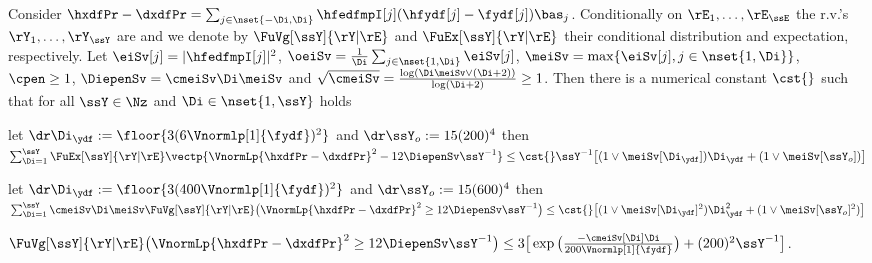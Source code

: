 \begin{lm}\label{au:re:rest}
Consider  
$\hxdfPr-\dxdfPr=\sum_{j\in\nset{-\Di,\Di}}\hfedfmpI[j](\hfydf[j]-\fydf[j])\bas_j$.
Conditionally on $\rE_1,\dotsc,\rE_{\ssE}$ the r.v.'s
$\rY_1,\dotsc,\rY_{\ssY}$ are \iid and we  denote by $\FuVg[\ssY]{\rY|\rE}$ and $\FuEx[\ssY]{\rY|\rE}$ their conditional
 distribution and expectation, respectively. 
Let $\eiSv[j]=|\hfedfmpI[j]|^2$,
$\oeiSv=\tfrac{1}{\Di}\sum_{j\in\nset{1,\Di}}\eiSv[j]$, $\meiSv=
  \max\{\eiSv[j],j\in\nset{1,\Di}\}$, $\cpen\geq1$, $\DiepenSv=\cmeiSv\Di \meiSv$
 and $\sqrt{\cmeiSv}=\tfrac{\log (\Di\meiSv \vee (\Di+2))}{\log(\Di+2)}\geq1$.  Then there is a numerical constant $\cst{}$ such
 that for all $\ssY\in\Nz$ and $\Di\in\nset{1,\ssY}$ holds
  \begin{resListeN}[]
  \item\label{au:re:rest:i} let $\dr\Di_{\ydf}:=\floor{  3(6\Vnormlp[1]{\fydf})^2}$ and $\dr \ssY_{o}:={15(200)^4}$ then\\ 
    $ \sum_{\Di=1}^{\ssY}\FuEx[\ssY]{\rY|\rE} \vectp{\VnormLp{\hxdfPr-\dxdfPr}^2 - 12\DiepenSv\ssY^{-1}} 
\leq \cst{}\ssY^{-1}\big[(1\vee\meiSv[\Di_{\ydf}])\Di_{\ydf}+(1\vee\meiSv[\ssY_{o}])\big]$
  \item\label{au:re:rest:ii} let
    $\dr\Di_{\ydf}:=\floor{3(400\Vnormlp[1]{\fydf})^2}$ and
    $\dr \ssY_{o}:=15({600})^4$ then\\
    $\sum_{\Di=1}^{\ssY}\cmeiSv \Di \meiSv\FuVg[\ssY]{\rY|\rE}\big(\VnormLp{\hxdfPr-\dxdfPr}^2 \geq 12\DiepenSv\ssY^{-1}\big)
\leq\cst{}\big[(1\vee\meiSv[\Di_{\ydf}]^2)\Di_{\ydf}^2+(1\vee\meiSv[\ssY_{o}]^2)\big]$
  \item\label{au:re:rest:iii} 
  $\FuVg[\ssY]{\rY|\rE}\big(\VnormLp{\hxdfPr-\dxdfPr}^2 \geq 12\DiepenSv\ssY^{-1}\big)\leq 3 \big[\exp\big(\tfrac{-\cmeiSv[\Di]\Di}{200\Vnormlp[1]{\fydf}}\big)
    +(200)^2\ssY^{-1}\big] $.
  \end{resListeN}
\end{lm}
